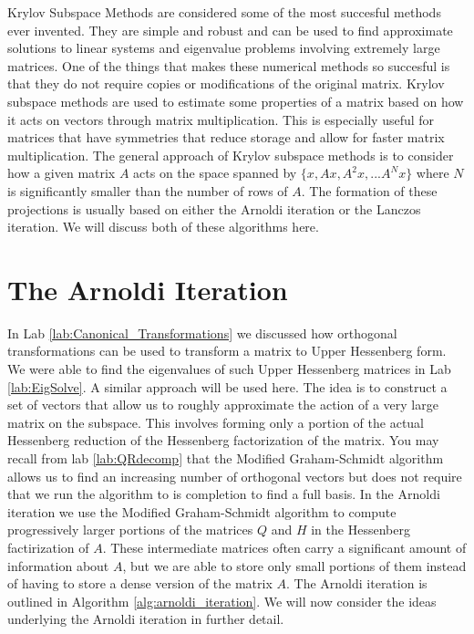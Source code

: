 \label{lab:kry_arnoldi}


Krylov Subspace Methods are considered some of the most succesful  methods ever invented.
They are simple and robust and can be used to find approximate solutions to linear systems and eigenvalue problems involving extremely large matrices.
One of the things that makes these numerical methods so succesful is that they do not require copies or modifications of the original matrix.
Krylov subspace methods are used to estimate some properties of a matrix based on how it acts on vectors through matrix multiplication.
This is especially useful for matrices that have symmetries that reduce storage and allow for faster matrix multiplication.
The general approach of Krylov subspace methods is to consider how a given matrix $A$ acts on the space spanned by $\{ x, Ax, A^2 x, ...A^N x \}$ where $N$ is significantly smaller than the number of rows of $A$.
The formation of these projections is usually based on either the Arnoldi iteration or the Lanczos iteration.
We will discuss both of these algorithms here.

\section*{The Arnoldi Iteration}

In Lab \ref{lab:Canonical_Transformations} we discussed how orthogonal transformations can be used to transform a matrix to Upper Hessenberg form.
We were able to find the eigenvalues of such Upper Hessenberg matrices in Lab \ref{lab:EigSolve}.
A similar approach will be used here.
The idea is to construct a set of vectors that allow us to roughly approximate the action of a very large matrix on the subspace.
This involves forming only a portion of the actual Hessenberg reduction of the Hessenberg factorization of the matrix.
You may recall from lab \ref{lab:QRdecomp} that the Modified Graham-Schmidt algorithm allows us to find an increasing number of orthogonal vectors but does not require that we run the algorithm to is completion to find a full basis.
In the Arnoldi iteration we use the Modified Graham-Schmidt algorithm to compute progressively larger portions of the matrices $Q$ and $H$ in the Hessenberg factirization of $A$.
These intermediate matrices often carry a significant amount of information about $A$, but we are able to store only small portions of them instead of having to store a dense version of the matrix $A$.
The Arnoldi iteration is outlined in Algorithm \ref{alg:arnoldi_iteration}.
We will now consider the ideas underlying the Arnoldi iteration in further detail.


